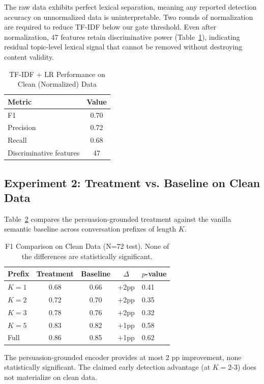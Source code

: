 \documentclass[11pt]{article}
\begin{document}
The raw data exhibits perfect lexical separation, meaning any reported detection accuracy on unnormalized data is uninterpretable. Two rounds of normalization are required to reduce TF-IDF below our gate threshold. Even after normalization, 47 features retain discriminative power (Table~\ref{tab:tfidf_clean}), indicating residual topic-level lexical signal that cannot be removed without destroying content validity.

\begin{table}[h]
\centering
\caption{TF-IDF + LR Performance on Clean (Normalized) Data}
\label{tab:tfidf_clean}
\begin{tabular}{lc}
\toprule
\textbf{Metric} & \textbf{Value} \\
\midrule
F1 & 0.70 \\
Precision & 0.72 \\
Recall & 0.68 \\
Discriminative features & 47 \\
\bottomrule
\end{tabular}
\end{table}

\subsection{Experiment 2: Treatment vs. Baseline on Clean Data}

Table~\ref{tab:core} compares the persuasion-grounded treatment against the vanilla semantic baseline across conversation prefixes of length $K$.

\begin{table}[h]
\centering
\caption{F1 Comparison on Clean Data (N=72 test). None of the differences are statistically significant.}
\label{tab:core}
\begin{tabular}{lcccl}
\toprule
\textbf{Prefix} & \textbf{Treatment} & \textbf{Baseline} & \textbf{$\Delta$} & \textbf{$p$-value} \\
\midrule
$K=1$ & 0.68 & 0.66 & +2pp & 0.41 \\
$K=2$ & 0.72 & 0.70 & +2pp & 0.35 \\
$K=3$ & 0.78 & 0.76 & +2pp & 0.32 \\
$K=5$ & 0.83 & 0.82 & +1pp & 0.58 \\
Full & 0.86 & 0.85 & +1pp & 0.62 \\
\bottomrule
\end{tabular}
\end{table}

The persuasion-grounded encoder provides at most 2 pp improvement, none statistically significant. The claimed early detection advantage (at $K=2$-$3$) does not materialize on clean data.
\end{document}
